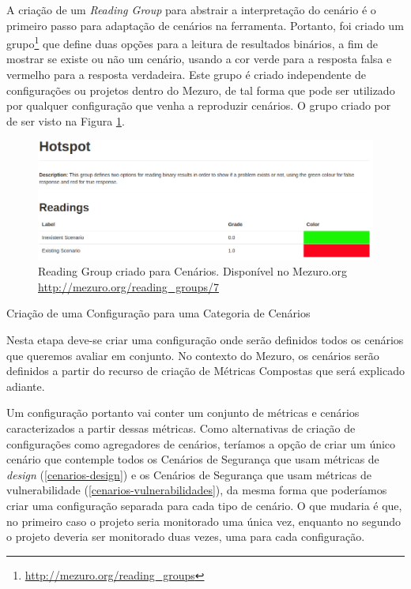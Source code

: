 A criação de um \emph{Reading Group} para abstrair a interpretação do cenário é o primeiro passo para adaptação de cenários na ferramenta. Portanto, foi criado um grupo\footnote{\url{http://mezuro.org/reading_groups}} que define duas opções para a leitura de resultados binários, a fim de mostrar se existe ou não um cenário, usando a cor verde para a resposta falsa e vermelho para a resposta verdadeira. Este grupo é criado independente de configurações ou projetos dentro do Mezuro, de tal forma que pode ser utilizado por qualquer configuração que venha a reproduzir cenários. O grupo criado por de ser visto na Figura \ref{reading_group}.

\graphicspath{{figuras/}}
\begin{figure}[h]
\centering
\includegraphics[width=1.0\textwidth]{reading_group}
\caption{Reading Group criado para Cenários. Disponível no Mezuro.org \url{http://mezuro.org/reading_groups/7}}
\label{reading_group}
\end{figure}

\begin{description}
	\item[Criação de uma Configuração para uma Categoria de Cenários]
\end{description}

Nesta etapa deve-se criar uma configuração onde serão definidos todos os cenários que queremos avaliar em conjunto. No contexto do Mezuro, os cenários serão definidos a partir do recurso de criação de Métricas Compostas que será explicado adiante.

Um configuração portanto vai conter um conjunto de métricas e cenários caracterizados a partir dessas métricas. Como alternativas de criação de configurações como agregadores de cenários, teríamos a opção de criar um único cenário que contemple todos os Cenários de Segurança que usam métricas de \emph{design} (\ref{cenarios-design}) e os Cenários de Segurança que usam métricas de vulnerabilidade (\ref{cenarios-vulnerabilidades}), da mesma forma que poderíamos criar uma configuração separada para cada tipo de cenário. O que mudaria é que, no primeiro caso o projeto seria monitorado uma única vez, enquanto no segundo o projeto deveria ser monitorado duas vezes, uma para cada configuração. 

